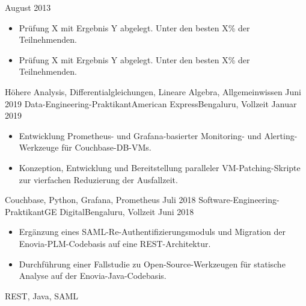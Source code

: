 \begin{experiences}
    {August 2013} {
      \begin{itemize}
        \item{Prüfung X mit Ergebnis Y abgelegt. Unter den besten X\% der Teilnehmenden.}
        \item{Prüfung X mit Ergebnis Y abgelegt. Unter den besten X\% der Teilnehmenden.}
      \end{itemize}
    }
    {Höhere Analysis, Differentialgleichungen, Lineare Algebra, Allgemeinwissen}
  \emptySeparator
  \fi
  \experience
    {Juni 2019} {Data-Engineering-Praktikant}{American Express}{Bengaluru, Vollzeit}
    {Januar 2019} {
      \begin{itemize}
        \item{Entwicklung Prometheus- und Grafana-basierter Monitoring- und Alerting-Werkzeuge für Couchbase-DB-VMs.}
        \item{Konzeption, Entwicklung und Bereitstellung paralleler VM-Patching-Skripte zur vierfachen Reduzierung der Ausfallzeit.}
      \end{itemize}
    }
    {Couchbase, Python, Grafana, Prometheus}
  \emptySeparator
  \experience
    {Juli 2018} {Software-Engineering-Praktikant}{GE Digital}{Bengaluru, Vollzeit}
    {Juni 2018} {
      \begin{itemize}
        \item{Ergänzung eines SAML-Re-Authentifizierungsmoduls und Migration der Enovia-PLM-Codebasis auf eine REST-Architektur.}
        \item{Durchführung einer Fallstudie zu Open-Source-Werkzeugen für statische Analyse auf der Enovia-Java-Codebasis.}
      \end{itemize}
    }
    {REST, Java, SAML}
  \emptySeparator
\end{experiences}
